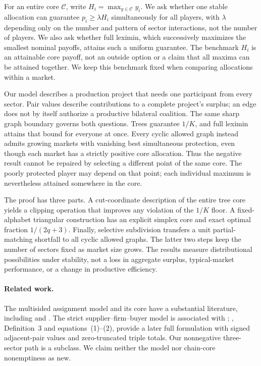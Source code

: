 \documentclass[11pt]{article}
\theoremstyle{remark}\newtheorem{remark}[theorem]{Remark}
\newcommand{\core}{\mathcal C}
\begin{document}
For an entire core $\core$, write $H_i=\max_{y\in\core}y_i$. We ask whether
one stable allocation can guarantee $p_i\ge\lambda H_i$ simultaneously for all
players, with $\lambda$ depending only on the number and pattern of sector
interactions, not the number of players. We also ask whether full leximin,
which successively maximizes the smallest nominal payoffs, attains such a
uniform guarantee. The benchmark $H_i$ is an attainable core payoff, not an
outside option or a claim that all maxima can be attained together. We keep
this benchmark fixed when comparing allocations within a market.

Our model describes a production project that needs one participant from
every sector. Pair values describe contributions to a complete project's
surplus; an edge does not by itself authorize a productive bilateral coalition.
The same sharp graph boundary governs both questions. Trees guarantee $1/K$,
and full leximin attains that bound for everyone at once. Every cyclic allowed
graph instead admits growing markets with vanishing best simultaneous
protection, even though each market has a strictly positive core allocation.
Thus the negative result cannot be repaired by selecting a different point
of the same core. The poorly protected player may depend on that point;
each individual maximum is nevertheless attained somewhere in the core.

The proof has three parts. A cut-coordinate description of the entire tree
core yields a clipping operation that improves any violation of the $1/K$
floor. A fixed-alphabet triangular construction has an explicit simplex core
and exact optimal fraction $1/(2q+3)$. Finally, selective subdivision transfers
a unit partial-matching shortfall to all cyclic allowed graphs. The latter two
steps keep the number of sectors fixed as market size grows. The results
measure distributional possibilities under stability, not a loss in aggregate
surplus, typical-market performance, or a change in productive efficiency.

\paragraph{Related work.}
The multisided assignment model and its core have a substantial literature,
including \citet{Quint1991} and \citet{Lucas1995}. The strict
supplier--firm--buyer model is associated with \citet{Stuart1997};
\citet{AtaySolymosi2018}, Definition~3 and equations~(1)--(2), provide a
later full formulation with signed adjacent-pair values and zero-truncated
triple totals. Our nonnegative three-sector path is a subclass. We claim
neither the model nor chain-core nonemptiness as new.
\end{document}

